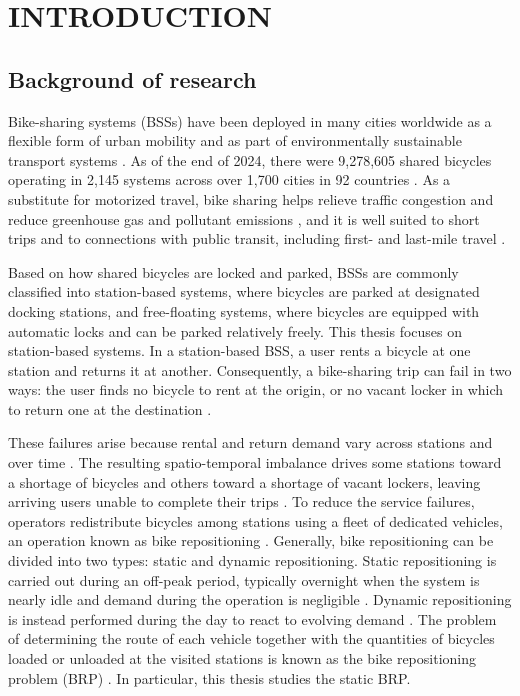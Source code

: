 \chapter{INTRODUCTION}

\section{Background of research}\label{sec:intro-background}

Bike-sharing systems (BSSs) have been deployed in many cities worldwide as a flexible form of urban mobility and as part of environmentally sustainable transport systems \citep{alvarez-valdesOptimizingLevelService2016}. As of the end of 2024, there were 9,278,605 shared bicycles operating in 2,145 systems across over 1,700 cities in 92 countries \citep{bswmreport2024}. As a substitute for motorized travel, bike sharing helps relieve traffic congestion and reduce greenhouse gas and pollutant emissions \citep{luo2019comparativelife,kou2020quantifyinggreenhouse}, and it is well suited to short trips and to connections with public transit, including first- and last-mile travel \citep{nathModellingMethodsPlanning2019,demaioBikesharingHistoryImpacts2009,jin2025connectinglast}.

Based on how shared bicycles are locked and parked, BSSs are commonly classified into station-based systems, where bicycles are parked at designated docking stations, and free-floating systems, where bicycles are equipped with automatic locks and can be parked relatively freely. This thesis focuses on station-based systems. In a station-based BSS, a user rents a bicycle at one station and returns it at another. Consequently, a bike-sharing trip can fail in two ways: the user finds no bicycle to rent at the origin, or no vacant locker in which to return one at the destination \citep{alvarez-valdesOptimizingLevelService2016,ravivStaticRepositioningBikesharing2013}.

These failures arise because rental and return demand vary across stations and over time \citep{datnerSettingInventoryLevels2019}. The resulting spatio-temporal imbalance drives some stations toward a shortage of bicycles and others toward a shortage of vacant lockers, leaving arriving users unable to complete their trips \citep{brinkmannInventoryRoutingBike2016}. To reduce the service failures, operators redistribute bicycles among stations using a fleet of dedicated vehicles, an operation known as bike repositioning \citep{ravivStaticRepositioningBikesharing2013}. Generally, bike repositioning can be divided into two types: static and dynamic repositioning. Static repositioning is carried out during an off-peak period, typically overnight when the system is nearly idle and demand during the operation is negligible \citep{ravivStaticRepositioningBikesharing2013}. Dynamic repositioning is instead performed during the day to react to evolving demand \citep{caggianiModelingFrameworkDynamic2018}. The problem of determining the route of each vehicle together with the quantities of bicycles loaded or unloaded at the visited stations is known as the bike repositioning problem (BRP) \citep{ravivStaticRepositioningBikesharing2013,brinkmannInventoryRoutingBike2016}. In particular, this thesis studies the static BRP.


